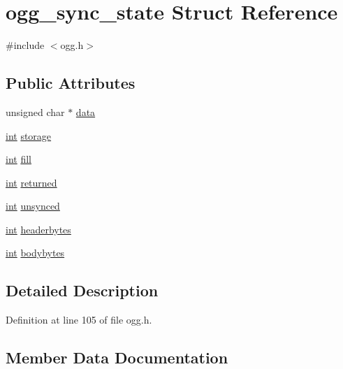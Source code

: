 \hypertarget{structogg__sync__state}{}\section{ogg\+\_\+sync\+\_\+state Struct Reference}
\label{structogg__sync__state}


{\ttfamily \#include $<$ogg.\+h$>$}

\subsection*{Public Attributes}
\begin{DoxyCompactItemize}
\item 
unsigned char $\ast$ \hyperlink{structogg__sync__state_adfc3f5d5a6434a582205ece0327fcc7d}{data}
\item 
\hyperlink{xmltok_8h_a5a0d4a5641ce434f1d23533f2b2e6653}{int} \hyperlink{structogg__sync__state_a15fc1bb5161fc4ae87b7a65982776c24}{storage}
\item 
\hyperlink{xmltok_8h_a5a0d4a5641ce434f1d23533f2b2e6653}{int} \hyperlink{structogg__sync__state_a3afef65cd358eab5827304b8c2360c7f}{fill}
\item 
\hyperlink{xmltok_8h_a5a0d4a5641ce434f1d23533f2b2e6653}{int} \hyperlink{structogg__sync__state_ac1b56ee81f71737f2f6397907f55a2e9}{returned}
\item 
\hyperlink{xmltok_8h_a5a0d4a5641ce434f1d23533f2b2e6653}{int} \hyperlink{structogg__sync__state_a8d538bb32400470f00080e2160158a76}{unsynced}
\item 
\hyperlink{xmltok_8h_a5a0d4a5641ce434f1d23533f2b2e6653}{int} \hyperlink{structogg__sync__state_abb64d78f386bc413527df838f2f681d5}{headerbytes}
\item 
\hyperlink{xmltok_8h_a5a0d4a5641ce434f1d23533f2b2e6653}{int} \hyperlink{structogg__sync__state_aa7ea6e81b751baaa04e4b49cb04e8317}{bodybytes}
\end{DoxyCompactItemize}


\subsection{Detailed Description}


Definition at line 105 of file ogg.\+h.



\subsection{Member Data Documentation}
